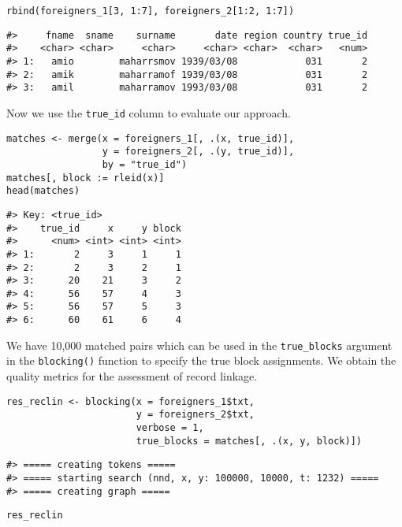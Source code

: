 \begin{verbatim}
rbind(foreigners_1[3, 1:7], foreigners_2[1:2, 1:7])
\end{verbatim}

\begin{verbatim}
#>     fname  sname    surname       date region country true_id
#>    <char> <char>     <char>     <char> <char>  <char>   <num>
#> 1:   amio        maharrsmov 1939/03/08            031       2
#> 2:   amik        maharramof 1939/03/08            031       2
#> 3:   amil        maharramov 1993/03/08            031       2
\end{verbatim}

Now we use the \texttt{true\_id} column to evaluate our approach.

\begin{verbatim}
matches <- merge(x = foreigners_1[, .(x, true_id)],
                 y = foreigners_2[, .(y, true_id)],
                 by = "true_id")
matches[, block := rleid(x)]
head(matches)
\end{verbatim}

\begin{verbatim}
#> Key: <true_id>
#>    true_id     x     y block
#>      <num> <int> <int> <int>
#> 1:       2     3     1     1
#> 2:       2     3     2     1
#> 3:      20    21     3     2
#> 4:      56    57     4     3
#> 5:      56    57     5     3
#> 6:      60    61     6     4
\end{verbatim}

We have 10,000 matched pairs which can be used in the \texttt{true\_blocks}
argument in the \texttt{blocking()} function to specify the true block
assignments. We obtain the quality metrics for the assessment of record
linkage.

\begin{verbatim}
res_reclin <- blocking(x = foreigners_1$txt,
                       y = foreigners_2$txt,
                       verbose = 1,
                       true_blocks = matches[, .(x, y, block)])
\end{verbatim}

\begin{verbatim}
#> ===== creating tokens =====
#> ===== starting search (nnd, x, y: 100000, 10000, t: 1232) =====
#> ===== creating graph =====
\end{verbatim}

\begin{verbatim}
res_reclin
\end{verbatim}


